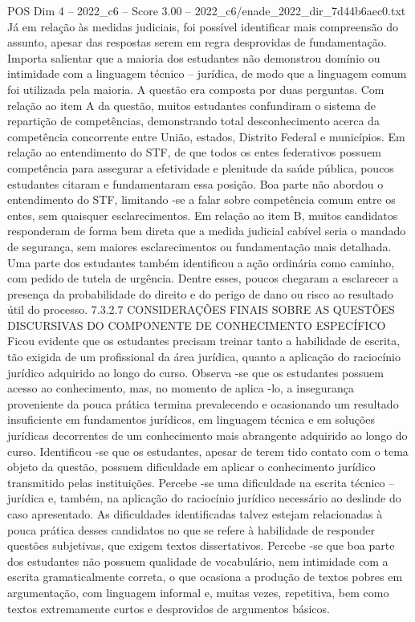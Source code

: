 \begin{textsample}{POS Dim 4 – 2022\_c6 – Score 3.00 – 2022\_c6/enade\_2022\_dir\_7d44b6aec0.txt}
Já em relação às medidas judiciais, foi possível identificar mais compreensão do assunto, apesar das respostas serem em regra desprovidas de fundamentação.
Importa salientar que a maioria dos estudantes não demonstrou domínio ou intimidade com a linguagem técnico – jurídica, de modo que a linguagem comum foi utilizada pela maioria.
A questão era composta por duas perguntas.
Com relação ao item A da questão, muitos estudantes confundiram o sistema de repartição de competências, demonstrando total desconhecimento acerca da competência concorrente entre União, estados, Distrito Federal e municípios.
Em relação ao entendimento do STF, de que todos os entes federativos possuem competência para assegurar a efetividade e plenitude da saúde pública, poucos estudantes citaram e fundamentaram essa posição.
Boa parte não abordou o entendimento do STF, limitando -se a falar sobre competência comum entre os entes, sem quaisquer esclarecimentos.
Em relação ao item B, muitos candidatos responderam de forma bem direta que a medida judicial cabível seria o mandado de segurança, sem maiores esclarecimentos ou fundamentação mais detalhada.
Uma parte dos estudantes também identificou a ação ordinária como caminho, com pedido de tutela de urgência.
Dentre esses, poucos chegaram a esclarecer a presença da probabilidade do direito e do perigo de dano ou risco ao resultado útil do processo. 7.3.2.7 CONSIDERAÇÕES FINAIS SOBRE AS QUESTÕES DISCURSIVAS DO COMPONENTE DE CONHECIMENTO ESPECÍFICO Ficou evidente que os estudantes precisam treinar tanto a habilidade de escrita, tão exigida de um profissional da área jurídica, quanto a aplicação do raciocínio jurídico adquirido ao longo do curso.
Observa -se que os estudantes possuem acesso ao conhecimento, mas, no momento de aplica -lo, a insegurança proveniente da pouca prática termina prevalecendo e ocasionando um resultado insuficiente em fundamentos jurídicos, em linguagem técnica e em soluções jurídicas decorrentes de um conhecimento mais abrangente adquirido ao longo do curso.
Identificou -se que os estudantes, apesar de terem tido contato com o tema objeto da questão, possuem dificuldade em aplicar o conhecimento jurídico transmitido pelas instituições.
Percebe -se uma dificuldade na escrita técnico – jurídica e, também, na aplicação do raciocínio jurídico necessário ao deslinde do caso apresentado.
As dificuldades identificadas talvez estejam relacionadas à pouca prática desses candidatos no que se refere à habilidade de responder questões subjetivas, que exigem textos dissertativos.
Percebe -se que boa parte dos estudantes não possuem qualidade de vocabulário, nem intimidade com a escrita gramaticalmente correta, o que ocasiona a produção de textos pobres em argumentação, com linguagem informal e, muitas vezes, repetitiva, bem como textos extremamente curtos e desprovidos de argumentos básicos.

\end{textsample}
